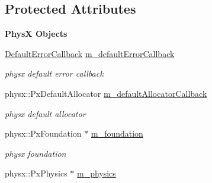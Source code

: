 \subsection*{Protected Attributes}
\begin{Indent}{\bf PhysX Objects}\par
{\em \label{_amgrp5dcec0622931609ebc9147725ef87cd9}
 }\begin{DoxyCompactItemize}
\item 
\hypertarget{classContent_1_1Physics_1_1PhysicsPhysX_a80ad501762e55cc180033680f54f99bb}{
\hyperlink{classDefaultErrorCallback}{DefaultErrorCallback} \hyperlink{classContent_1_1Physics_1_1PhysicsPhysX_a80ad501762e55cc180033680f54f99bb}{m\_\-defaultErrorCallback}}
\label{classContent_1_1Physics_1_1PhysicsPhysX_a80ad501762e55cc180033680f54f99bb}

\begin{DoxyCompactList}\small\item\em physx default error callback \item\end{DoxyCompactList}\item 
\hypertarget{classContent_1_1Physics_1_1PhysicsPhysX_a8bbdd8556dac30893a1cc33eaabe5a96}{
physx::PxDefaultAllocator \hyperlink{classContent_1_1Physics_1_1PhysicsPhysX_a8bbdd8556dac30893a1cc33eaabe5a96}{m\_\-defaultAllocatorCallback}}
\label{classContent_1_1Physics_1_1PhysicsPhysX_a8bbdd8556dac30893a1cc33eaabe5a96}

\begin{DoxyCompactList}\small\item\em physx default allocator \item\end{DoxyCompactList}\item 
\hypertarget{classContent_1_1Physics_1_1PhysicsPhysX_aef9eecc7f42bf2dda3f37d5eb4cbdfe2}{
physx::PxFoundation $\ast$ \hyperlink{classContent_1_1Physics_1_1PhysicsPhysX_aef9eecc7f42bf2dda3f37d5eb4cbdfe2}{m\_\-foundation}}
\label{classContent_1_1Physics_1_1PhysicsPhysX_aef9eecc7f42bf2dda3f37d5eb4cbdfe2}

\begin{DoxyCompactList}\small\item\em physx foundation \item\end{DoxyCompactList}\item 
\hypertarget{classContent_1_1Physics_1_1PhysicsPhysX_a6c3fcefd169b0c628b884a16b7d35a58}{
physx::PxPhysics $\ast$ \hyperlink{classContent_1_1Physics_1_1PhysicsPhysX_a6c3fcefd169b0c628b884a16b7d35a58}{m\_\-physics}}
\label{classContent_1_1Physics_1_1PhysicsPhysX_a6c3fcefd169b0c628b884a16b7d35a58}


\end{DoxyCompactItemize}
\end{Indent}
